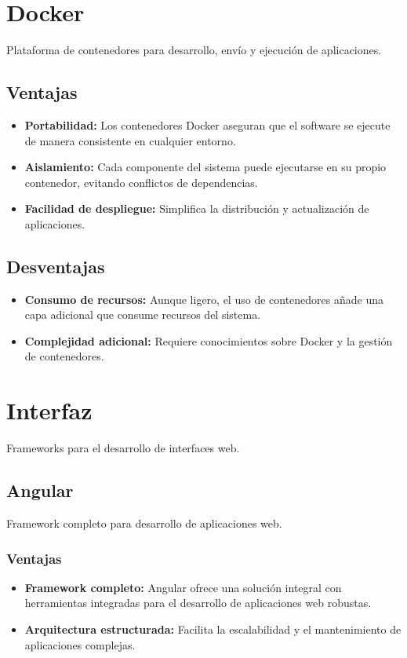 \clearpage
\section{Docker}
Plataforma de contenedores para desarrollo, envío y ejecución de aplicaciones.

\subsection{Ventajas}
\begin{itemize}
    \item \textbf{Portabilidad:} Los contenedores Docker aseguran que el software se ejecute de manera consistente en cualquier entorno.
    
    \item \textbf{Aislamiento:} Cada componente del sistema puede ejecutarse en su propio contenedor, evitando conflictos de dependencias.
    
    \item \textbf{Facilidad de despliegue:} Simplifica la distribución y actualización de aplicaciones.
\end{itemize}

\subsection{Desventajas}
\begin{itemize}
    \item \textbf{Consumo de recursos:} Aunque ligero, el uso de contenedores añade una capa adicional que consume recursos del sistema.
    
    \item \textbf{Complejidad adicional:} Requiere conocimientos sobre Docker y la gestión de contenedores.
\end{itemize}

\clearpage
\section{Interfaz}
Frameworks para el desarrollo de interfaces web.

\subsection{Angular}
Framework completo para desarrollo de aplicaciones web.

\subsubsection{Ventajas}
\begin{itemize}
    \item \textbf{Framework completo:} Angular ofrece una solución integral con herramientas integradas para el desarrollo de aplicaciones web robustas.
    
    \item \textbf{Arquitectura estructurada:} Facilita la escalabilidad y el mantenimiento de aplicaciones complejas.
\end{itemize}

